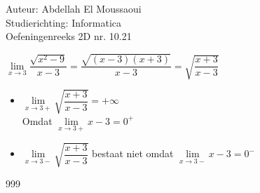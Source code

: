 \documentclass[a4paper]{article}
\begin{document}
  
\noindent \large Auteur: Abdellah El Moussaoui \\
\noindent \large Studierichting: Informatica\\
\noindent \large Oefeningenreeks 2D nr. 10.21\\

\medskip

\normalsize


$\lim\limits_{x\to3} \dfrac{\sqrt{x^2-9}}{x-3}= \dfrac{\sqrt{\left(x-3\right)\left(x+3\right)}}{x-3}=\sqrt{\dfrac{x+3}{x-3}}$\\

\begin{itemize}
    \item $\lim\limits_{x\to3+} \sqrt{\dfrac{x+3}{x-3}}=+\infty$\\
    
Omdat $\lim\limits_{x\to3+} x-3 = 0^+$\\

    \item $\lim\limits_{x\to3-} \sqrt{\dfrac{x+3}{x-3}}$ bestaat niet omdat $\lim\limits_{x\to3-} x-3 = 0^-$\\

\end{itemize}





\begin{thebibliography}{999}
\end{thebibliography}
\end{document}
